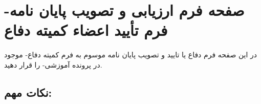 \newpage
\thispagestyle{empty}

\section*{صفحه فرم ارزیابی و تصویب پایان نامه- فرم تأیید اعضاء كميته دفاع}

\fontsize{12pt}{14pt}\selectfont
\vspace*{1cm}
   در این صفحه فرم دفاع یا تایید و تصویب پایان نامه موسوم به فرم کمیته دفاع- موجود در پرونده آموزشی- را قرار دهید.
\vspace*{1cm}


\subsection*{نکات مهم:}
 
